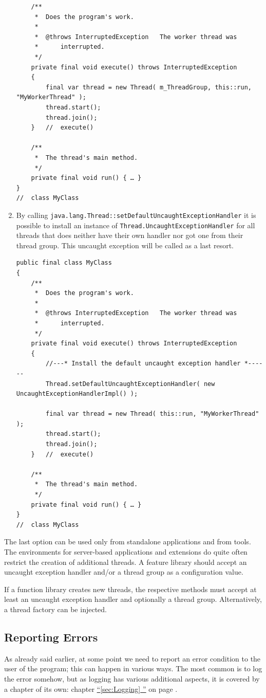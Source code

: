 \documentclass[11pt,a4paper, titlepage, parskip=half, headsepline, footsepline, cleardoublepage=current, headheight=1cm]{scrbook}
\newcommand*{\tqfullvref}[1]{\hyperref[{#1}]{“\ref*{#1} \nameref*{#1}”} on page \pageref{#1}}
\begin{document}
\begin{enumerate}
{\begin{lstlisting}
    /**
     *  Does the program's work.
     *
     *  @throws InterruptedException   The worker thread was
     *      interrupted.
     */
    private final void execute() throws InterruptedException
    {
        final var thread = new Thread( m_ThreadGroup, this::run, "MyWorkerThread" );
        thread.start();
        thread.join();
    }   //  execute()
     
    /**
     *  The thread's main method.
     */
    private final void run() { … }
}
//  class MyClass
\end{lstlisting}
}
\item{By calling \lstinline|java.lang.Thread::setDefaultUncaughtExceptionHandler|\autocite{ORACLE_DOC_THREAD:setDefaultUncaughtExceptionHandler} it is possible to install an instance of \lstinline|Thread.UncaughtExceptionHandler| for all threads that does neither have their own handler nor got one from their thread group. This uncaught exception will be called as a last resort.
\begin{lstlisting}
public final class MyClass
{
    /**
     *  Does the program's work.
     *
     *  @throws InterruptedException   The worker thread was
     *      interrupted.
     */
    private final void execute() throws InterruptedException
    {
        //---* Install the default uncaught exception handler *------
        Thread.setDefaultUncaughtExceptionHandler( new UncaughtExceptionHandlerImpl() );
        
        final var thread = new Thread( this::run, "MyWorkerThread" );
        thread.start();
        thread.join();
    }   //  execute()
     
    /**
     *  The thread's main method.
     */
    private final void run() { … }
}
//  class MyClass
\end{lstlisting}
}
\end{enumerate}

The last option can be used only from standalone applications and from tools. The environments for server-based applications and extensions do quite often restrict the creation of additional threads. A feature library should accept an uncaught exception handler and/or a thread group as a configuration value.

If a function library creates new threads, the respective methods must accept at least an uncaught exception handler and optionally a thread group. Alternatively, a thread factory\autocite{ORACLE_DOC_THREADFACTORY_INTERFACE} can be injected.
 
\subsection{Reporting Errors}\label{sec:ReportingErrors}
As already said earlier, at some point we need to report an error condition to the user of the program; this can happen in various ways. The most common is to log the error somehow, but as logging has various additional aspects, it is covered by a chapter of its own: chapter \tqfullvref{sec:Logging}.
\end{document}

